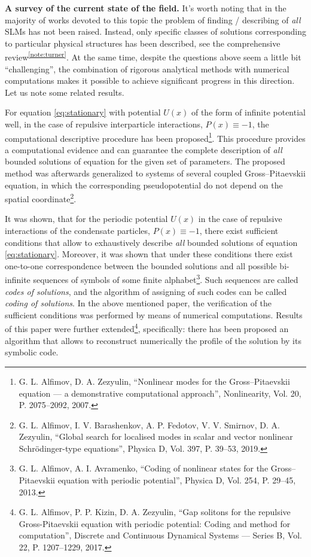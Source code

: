 \documentclass[candidate, href, colorlinks]{disser}
\begin{document}
\textbf{A survey of the current state of the field.}
It's worth noting that in the majority of works devoted to this topic the problem of finding / describing of {\it all} SLMs has not been raised.
Instead, only specific classes of solutions corresponding to particular physical structures has been described, see the comprehensive review\textsuperscript{\ref{note:turner}}.
At the same time, despite the questions above seem a little bit ``challenging'', the combination of rigorous analytical methods with numerical computations makes it possible to achieve significant progress in this direction.
Let us note some related results.

For equation \eqref{eq:stationary} with potential $U(x)$ of the form of infinite potential well, in the case of repulsive interparticle interactions, $P(x) \equiv -1$, the computational descriptive procedure has been proposed\footnote{\label{note:alfzez} G. L. Alfimov, D. A. Zezyulin, ``Nonlinear modes for the Gross--Pitaevskii equation --- a demonstrative computational approach'', Nonlinearity, Vol. 20, P. 2075--2092, 2007.}.
This procedure provides a computational evidence and can guarantee the complete description of {\it all} bounded solutions of equation for the given set of parameters.
The proposed method was afterwards generalized to systems of several coupled Gross--Pitaevskii equation, in which the corresponding pseudopotential do not depend on the spatial coordinate\footnote{G. L. Alfimov, I. V. Barashenkov, A. P. Fedotov, V. V. Smirnov, D. A. Zezyulin, ``Global search for localised modes in scalar and vector nonlinear Schr{\"o}dinger-type equations'', Physica D, Vol. 397, P. 39--53, 2019.}.

It was shown, that for the periodic potential $U(x)$ in the case of repulsive interactions of the condensate particles, $P(x) \equiv -1$, there exist sufficient conditions that allow to exhaustively describe {\it all} bounded solutions of equation \eqref{eq:stationary}.
Moreover, it was shown that under these conditions there exist one-to-one correspondence between the bounded solutions and all possible bi-infinite sequences of symbols of some finite alphabet\footnote{\label{note:alfavr} G. L. Alfimov, A. I. Avramenko, ``Coding of nonlinear states for the Gross--Pitaevskii equation with periodic potential'', Physica D, Vol. 254, P. 29--45, 2013.}.
Such sequences are called {\it codes of solutions}, and the algorithm of assigning of such codes can be called {\it coding of solutions}.
In the above mentioned paper, the verification of the sufficient conditions was performed by means of numerical computations.
Results of this paper were further extended\footnote{G. L. Alfimov, P. P. Kizin, D. A. Zezyulin, ``Gap solitons for the repulsive Gross-Pitaevskii equation with periodic potential: Coding and method for computation'', Discrete and Continuous Dynamical Systems --- Series B, Vol. 22, P. 1207--1229, 2017.}, specifically: there has been proposed an algorithm that allows to reconstruct numerically the profile of the solution by its symbolic code.
\end{document}
